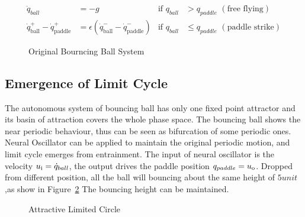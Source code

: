 \begin{align}
\label{eq:bbeq}
\ddot{q}_{ball}&=-g&\mathrm{if}\,\,q_{ball} &> q_{paddle}\,\,\mathrm{(free\,\,flying)} \nonumber\\
\dot{q}^{+}_{\mathrm{ball}} - \dot{q}^{+}_{\mathrm{paddle}} &=  \epsilon(\dot{q}^{-}_{\mathrm{ball}} - \dot{q}^{-}_{\mathrm{paddle}})&\mathrm{if}\,\,q_{ball} &\leq {q_{paddle}}\,\,\mathrm{(paddle\,\,strike)}\nonumber
\end{align}



\begin{figure}[h]
\begin{center}
	
\end{center}
\caption{Original Bourncing Ball System}
\label{fig:bborg}
\end{figure}



\subsection*{Emergence of Limit Cycle}
The autonomous system of bouncing ball has only one fixed point attractor and its basin of attraction covers the whole phase space.
The bouncing ball shows the near periodic behaviour, thus can be seen as bifurcation of some periodic ones.
Neural Oscillator can be applied to maintain the original periodic motion, and limit cycle emerges from entrainment.
The input of neural oscillator is the velocity $u_{\mathrm{i}}=\dot{q}_{ball}$, the output drives the paddle position $q_{paddle}=u_{\mathrm{o}}$.
Dropped from different position, all the ball will bouncing  about the same height of $5 unit$,as show in Figure~\ref{fig:bb_attractive_circle}
The bouncing height can be maintained.

\begin{figure}[h]
\begin{center}
	
\end{center}
\caption{Attractive Limited Circle}
\label{fig:bb_attractive_circle}
\end{figure}

